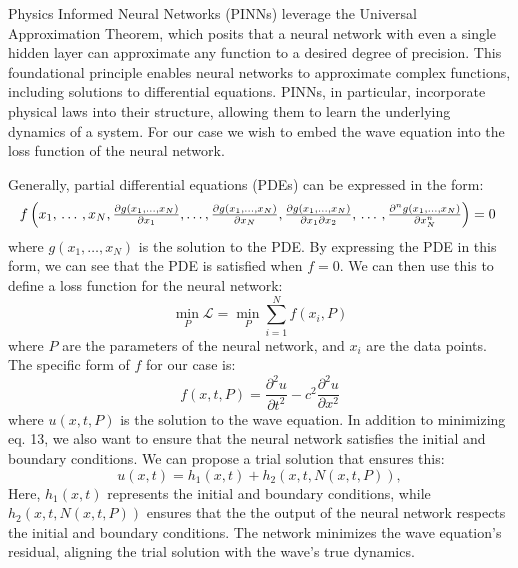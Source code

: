 \documentclass[twoside,11pt]{report}
\begin{document}
    Physics Informed Neural Networks (PINNs) leverage the Universal Approximation Theorem, which posits 
    that a neural network with even a single hidden layer can approximate any function to a desired degree 
    of precision. This foundational principle enables neural networks to approximate complex functions, including 
    solutions to differential equations.
    PINNs, in particular, incorporate physical laws into their structure, allowing them to learn the underlying 
    dynamics of a system. For our case we wish to embed the wave equation into the loss function of the neural network.

    Generally, partial differential equations (PDEs) can be expressed in the form:
    \begin{equation}
    \resizebox{1.0\textwidth}{!}{$
        f\left(x_1, \, \dots \, , x_N, \frac{\partial g(x_1,\dots,x_N) }{\partial x_1}, 
            \dots , \frac{\partial g(x_1,\dots,x_N) }{\partial x_N}, \frac{\partial g(x_1,\dots,x_N) }
        {\partial x_1\partial x_2}, \, \dots \, , \frac{\partial^n g(x_1,\dots,x_N) }
        {\partial x_N^n} \right) = 0$
    }
    \end{equation}
    where $g(x_1,\dots,x_N)$ is the solution to the PDE. By expressing the PDE in this form, we can 
    see that the PDE is satisfied when $f=0$. We can then use this to define a loss function for the neural network:
    \begin{equation}
    \min_{P} \mathcal{L} = \min_{P} \sum_{i=1}^{N} f(x_i, P)
    \end{equation}
    where $P$ are the parameters of the neural network, and $x_i$ are the data points. 
    The specific form of $f$ for our case is:
    \begin{equation}
    f(x,t,P) = \frac{\partial^2 u}{\partial t^2} - c^2 \frac{\partial^2 u}{\partial x^2}
    \end{equation}
    where $u(x,t,P)$ is the solution to the wave equation. 
    In addition to minimizing eq. 13, we also want to ensure that the neural network satisfies the 
    initial and boundary conditions. We can propose a trial solution that ensures this:
    \begin{equation}
    u(x, t) = h_1(x, t) + h_2(x, t, N(x, t, P)),
    \end{equation}
    Here, $h_1(x,t)$ represents the initial and boundary conditions,
    while $h_2(x,t, N(x,t,P))$ ensures that the the output of the neural network respects 
    the initial and boundary conditions.
    The network minimizes the wave equation's residual, aligning the trial solution with the wave's true dynamics.
\end{document}
